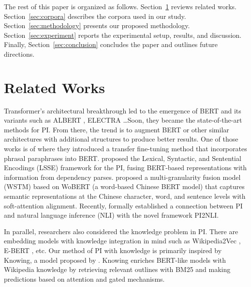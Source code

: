 \documentclass{llncs}
\begin{document}
The rest of this paper is organized as follows. Section~\ref{sec:related} reviews related works. 
Section~\ref{sec:corpora} describes the corpora used in our study. 
Section~\ref{sec:methodology} presents our proposed methodology. 
Section~\ref{sec:experiment} reports the experimental setup, results, and discussion. 
Finally, Section~\ref{sec:conclusion} concludes the paper and outlines future directions.

\section{Related Works}
\label{sec:related}

%
%
Transformer's architectural breakthrough led to the emergence of BERT \parencite{devlin2019bert} and its variants such as ALBERT \parencite{lan2020albert}, ELECTRA \parencite{clark2020electra}\dots Soon, they became the state-of-the-art methods for PI. From there, the trend is to augment BERT or other similar architectures with additional structures to produce better results. One of those works is of \textcite{arase2021} where they introduced a transfer fine-tuning method that incorporates phrasal paraphrases into BERT. \textcite{xu2020} proposed the Lexical, Syntactic, and Sentential Encodings (LSSE) framework for the PI, fusing BERT-based representations with information from dependency parses. \textcite{yu2024} proposed a multi-granularity fusion model (WSTM) based on WoBERT (a word-based Chinese BERT model) that captures semantic representations at the Chinese character, word, and sentence levels with soft-attention alignment. Recently, \textcite{shi2024} formally established a connection between PI and natural language inference (NLI) with the novel framework PI2NLI.

%
%
In parallel, researchers also considered the knowledge problem in PI. There are embedding models with knowledge integration in mind such as Wikipedia2Vec \parencite{yamada2020wikipedia2vec}, E-BERT \parencite{poerner2020ebert}, etc. Our method of PI with knowledge is primarily inspired by Knowing, a model proposed by \textcite{wang2021}. Knowing enriches BERT-like models with Wikipedia knowledge by retrieving relevant outlines with BM25 \parencite{robertson2009} and making predictions based on attention and gated mechanisms.
\end{document}
